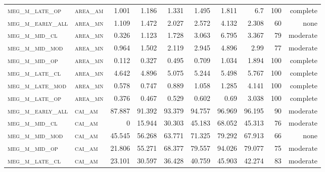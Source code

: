 \begin{landscape}
\begin{center}
\begin{footnotesize}
\begin{longtable}{llrrrrr|rrr}
\textsc{meg\_m\_late\_op  } & \textsc{area\_am  }    & 1.001    & 1.186    & 1.331    & 1.495    & 1.811      & 6.7           & 100           & complete             \\
\textsc{meg\_m\_early\_all} & \textsc{area\_mn  }    & 1.109    & 1.472    & 2.027    & 2.572    & 4.132      & 2.308         & 60            & none              \\
\textsc{meg\_m\_mid\_cl   } & \textsc{area\_mn  }    & 0.326    & 1.123    & 1.728    & 3.063    & 6.795      & 3.367         & 79            & moderate              \\
\textsc{meg\_m\_mid\_mod  } & \textsc{area\_mn  }    & 0.964    & 1.502    & 2.119    & 2.945    & 4.896      & 2.99          & 77            & moderate              \\
\textsc{meg\_m\_mid\_op   } & \textsc{area\_mn  }    & 0.112    & 0.327    & 0.495    & 0.709    & 1.034      & 1.894         & 100           & complete             \\
\textsc{meg\_m\_late\_cl  } & \textsc{area\_mn  }    & 4.642    & 4.896    & 5.075    & 5.244    & 5.498      & 5.767         & 100           & complete             \\
\textsc{meg\_m\_late\_mod } & \textsc{area\_mn  }    & 0.578    & 0.747    & 0.889    & 1.058    & 1.285      & 4.141         & 100           & complete             \\
\textsc{meg\_m\_late\_op  } & \textsc{area\_mn  }    & 0.376    & 0.467    & 0.529    & 0.602    & 0.69       & 3.038         & 100           & complete             \\
\textsc{meg\_m\_early\_all} & \textsc{cai\_am   }    & 87.887   & 91.392   & 93.379   & 94.757   & 96.969     & 96.195        & 90            & moderate              \\
\textsc{meg\_m\_mid\_cl   } & \textsc{cai\_am   }    & 0        & 15.944   & 30.303   & 45.183   & 68.052     & 45.313        & 76            & moderate              \\
\textsc{meg\_m\_mid\_mod  } & \textsc{cai\_am   }    & 45.545   & 56.268   & 63.771   & 71.325   & 79.292     & 67.913        & 66            & none              \\
\textsc{meg\_m\_mid\_op   } & \textsc{cai\_am   }    & 21.806   & 55.271   & 68.377   & 79.557   & 94.026     & 79.077        & 75            & moderate              \\
\textsc{meg\_m\_late\_cl  } & \textsc{cai\_am   }    & 23.101   & 30.597   & 36.428   & 40.759   & 45.903     & 42.274        & 83            & moderate              \\

\end{longtable}
\end{footnotesize}
\end{center}
\end{landscape}
